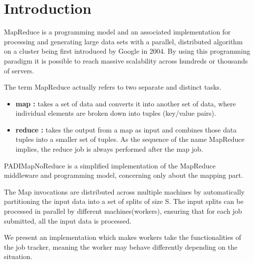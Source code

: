\section{Introduction}

MapReduce is a programming model and an associated implementation for processing and generating large data sets with a parallel, distributed algorithm on a cluster being first introduced by Google in 2004. 
By using this programming paradigm it is possible to reach massive scalability across hundreds or thousands of servers.



The term MapReduce actually refers to two separate and distinct tasks. 
\begin{itemize}
\item \textbf{map :} takes a set of data and converts it into another set of data, where individual elements are broken down into tuples (key/value pairs).
\item \textbf{reduce :} takes the output from a map as input and combines those data tuples into a smaller set of tuples. As the sequence of the name MapReduce implies, the reduce job is always performed after the map job.
\end{itemize}


PADIMapNoReduce is a simplified implementation of the MapReduce middleware and programming model, concerning only about the mapping part.

The Map invocations are distributed across multiple machines by automatically partitioning the input data into a set of splits of size S. The input splits can be processed in parallel by different machines(workers), ensuring that for each job submitted, all the input data is processed.

We present an implementation which makes workers take the functionalities of the job tracker, meaning the worker may behave differently depending on the situation.
